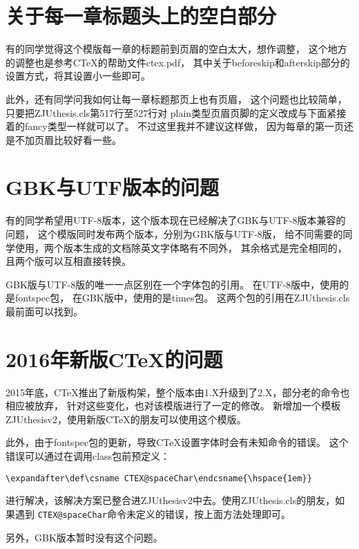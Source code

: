 \section{关于每一章标题头上的空白部分}

有的同学觉得这个模版每一章的标题前到页眉的空白太大，想作调整，
这个地方的调整也是参考CTeX的帮助文件ctex.pdf，
其中关于beforeskip和afterskip部分的设置方式，将其设置小一些即可。

此外，还有同学问我如何让每一章标题那页上也有页眉，
这个问题也比较简单，只要把ZJUthesis.cls第517行至527行对
plain类型页眉页脚的定义改成与下面紧接着的fancy类型一样就可以了。
不过这里我并不建议这样做，
因为每章的第一页还是不加页眉比较好看一些。


\section{GBK与UTF版本的问题}

有的同学希望用UTF-8版本，这个版本现在已经解决了GBK与UTF-8版本兼容的问题，
这个模版同时发布两个版本，分别为GBK版与UTF-8版，
给不同需要的同学使用，两个版本生成的文档除英文字体略有不同外，
其余格式是完全相同的，
且两个版可以互相直接转换。

GBK版与UTF-8版的唯一一点区别在一个字体包的引用。
在UTF-8版中，使用的是fontspec包，
在GBK版中，使用的是times包。
这两个包的引用在ZJUthesis.cls最前面可以找到。


\section{2016年新版CTeX的问题}

2015年底，CTeX推出了新版构架，整个版本由1.X升级到了2.X，部分老的命令也相应被放弃，
针对这些变化，也对该模版进行了一定的修改。
新增加一个模板ZJUthesisv2，使用新版CTeX的朋友可以使用这个模版。

此外，由于fontspec包的更新，导致CTeX设置字体时会有未知命令的错误。
这个错误可以通过在调用class包前预定义：

\verb+\expandafter\def\csname CTEX@spaceChar\endcsname{\hspace{1em}}+

进行解决，该解决方案已整合进ZJUthesisv2中去。使用ZJUthesis.cls的朋友，如果遇到
\verb+CTEX@spaceChar+命令未定义的错误，按上面方法处理即可。

另外，GBK版本暂时没有这个问题。